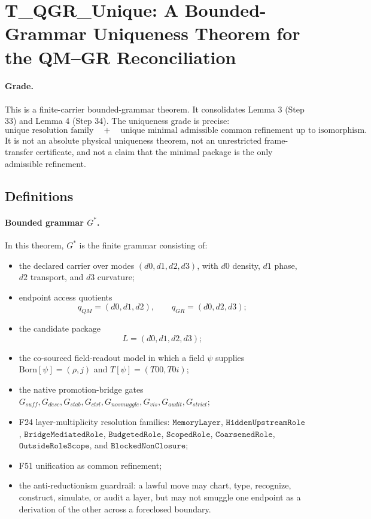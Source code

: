 \section*{T\_QGR\_Unique: A Bounded-Grammar Uniqueness Theorem for the QM--GR Reconciliation}

\paragraph{Grade.}
This is a finite-carrier bounded-grammar theorem.  It consolidates Lemma 3
(Step 33) and Lemma 4 (Step 34).  The uniqueness grade is precise:
\[
  \text{unique resolution family}
  \quad+\quad
  \text{unique minimal admissible common refinement up to isomorphism}.
\]
It is not an absolute physical uniqueness theorem, not an unrestricted
frame-transfer certificate, and not a claim that the minimal package is the
only admissible refinement.

\subsection*{Definitions}

\paragraph{Bounded grammar \(G^\ast\).}
In this theorem, \(G^\ast\) is the finite grammar consisting of:
\begin{itemize}
\item the declared carrier over modes
  \((d0,d1,d2,d3)\), with \(d0\) density, \(d1\) phase, \(d2\)
  transport, and \(d3\) curvature;
\item endpoint access quotients
  \[
    q_{QM}=(d0,d1,d2),
    \qquad
    q_{GR}=(d0,d2,d3);
  \]
\item the candidate package
  \[
    L=(d0,d1,d2,d3);
  \]
\item the co-sourced field-readout model in which a field \(\psi\) supplies
  \(\mathrm{Born}[\psi]=(\rho,j)\) and \(T[\psi]=(T00,T0i)\);
\item the native promotion-bridge gates
  \(G_{suff},G_{desc},G_{stab},G_{ctrl},G_{nosmuggle},G_{vis},G_{audit},G_{strict}\);
\item F24 layer-multiplicity resolution families:
  \(\texttt{MemoryLayer}\), \(\texttt{HiddenUpstreamRole}\),
  \(\texttt{BridgeMediatedRole}\), \(\texttt{BudgetedRole}\),
  \(\texttt{ScopedRole}\), \(\texttt{CoarsenedRole}\),
  \(\texttt{OutsideRoleScope}\), and \(\texttt{BlockedNonClosure}\);
\item F51 unification as common refinement;
\item the anti-reductionism guardrail: a lawful move may chart, type,
  recognize, construct, simulate, or audit a layer, but may not smuggle one
  endpoint as a derivation of the other across a foreclosed boundary.
\end{itemize}

